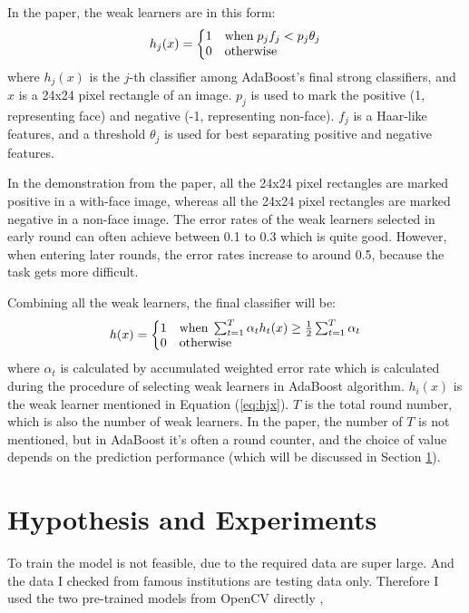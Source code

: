 \documentclass[10pt,twocolumn,letterpaper]{article}
\begin{document}
In the paper, the weak learners are in this form:
\begin{equation}
\label{eq:hjx}
h_{j}(x)=\left\{\begin{matrix*}[l]
1 & \textup{when} \; p_{j}f_{j} < p_{j}\theta _{j}\\
0 & \textup{otherwise}
\end{matrix*}\right.
\end{equation}
where $h_{j}(x)$ is the $j$-th classifier among AdaBoost's final strong classifiers, and $x$ is a 24x24 pixel rectangle of an image.
$p_{j}$ is used to mark the positive (1, representing face) and negative (-1, representing non-face).
$f_{j}$ is a Haar-like features, and a threshold $\theta _{j}$ is used for best separating positive and negative features.

In the demonstration from the paper, all the 24x24 pixel rectangles are marked positive in a with-face image,
whereas all the 24x24 pixel rectangles are marked negative in a non-face image.
The error rates of the weak learners selected in early round can often achieve between 0.1 to 0.3 which is quite good.
However, when entering later rounds, the error rates increase to around 0.5, because the task gets more difficult.

Combining all the weak learners, the final classifier will be:
$$h(x)=\left\{\begin{matrix*}[l]
1 & \textup{when} \; \sum_{t=1}^{T} \alpha _{t} h_{t}(x) \geq \frac{1}{2} \sum_{t=1}^{T} \alpha _{t}\\
0 & \textup{otherwise}
\end{matrix*}\right.$$
where $\alpha _{t}$ is calculated by accumulated weighted error rate which is calculated during the procedure of selecting weak learners in AdaBoost algorithm.
$h_{i}(x)$ is the weak learner mentioned in Equation (\ref{eq:hjx}). $T$ is the total round number, which is also the number of weak learners.
In the paper, the number of $T$ is not mentioned, but in AdaBoost it's often a round counter,
and the choice of value depends on the prediction performance (which will be discussed in Section \ref{sec:hypo}).


\section{Hypothesis and Experiments} \label{sec:hypo}
To train the model is not feasible, due to the required data are super large. And the data I checked from famous institutions are testing data only.
Therefore I used the two pre-trained models from OpenCV directly \cite{opencvmodels},
\end{document}
